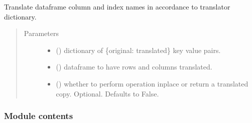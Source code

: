 \documentclass[letterpaper,10pt,english]{sphinxmanual}
\begin{document}

\begin{fulllineitems}
\label{\detokenize{dalio.util:dalio.util.translation_utils.translate_df}}
Translate dataframe column and index names in accordance to translator
dictionary.
\begin{quote}\begin{description}
\item[{Parameters}] \leavevmode\begin{itemize}
\item {} 
 () \textendash{} dictionary of \{original: translated\} key value
pairs.

\item {} 
 () \textendash{} dataframe to have rows and columns translated.

\item {} 
 () \textendash{} whether to perform operation inplace or return a
translated copy. Optional. Defaults to False.

\end{itemize}

\end{description}\end{quote}

\end{fulllineitems}



\subsubsection{Module contents}
\label{\detokenize{dalio.util:module-dalio.util}}\label{\detokenize{dalio.util:module-contents}}
\end{document}
